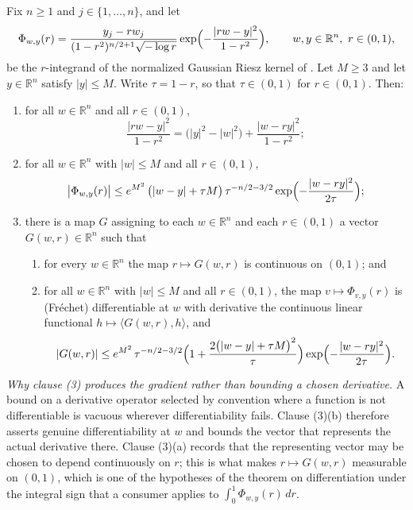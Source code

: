 \begin{lemma}
Fix $n \geq 1$ and $j \in \{1,\ldots,n\}$, and let
\[
  \Phi_{w,y}(r)
    = \frac{y_j - r w_j}{(1-r^2)^{n/2+1}\sqrt{-\log r}}
      \exp\Bigl(-\frac{|rw-y|^2}{1-r^2}\Bigr),
  \qquad w,y \in \mathbb{R}^n,\ r \in (0,1),
\]
be the $r$-integrand of the normalized Gaussian Riesz kernel of
.  Let $M \geq 3$ and let $y \in \mathbb{R}^n$ satisfy
$|y| \leq M$.  Write $\tau = 1-r$, so that $\tau \in (0,1)$ for $r \in (0,1)$.
Then:
\begin{enumerate}
\item for all $w \in \mathbb{R}^n$ and all $r \in (0,1)$,
\[
  \frac{|rw-y|^2}{1-r^2} = \bigl(|y|^2-|w|^2\bigr) + \frac{|w-ry|^2}{1-r^2} ;
\]
\item for all $w \in \mathbb{R}^n$ with $|w| \leq M$ and all $r \in (0,1)$,
\[
  \bigl|\Phi_{w,y}(r)\bigr|
    \leq e^{M^2}\,\bigl(|w-y| + \tau M\bigr)\,\tau^{-n/2-3/2}
      \exp\Bigl(-\frac{|w-ry|^2}{2\tau}\Bigr) ;
\]
\item there is a map $G$ assigning to each $w \in \mathbb{R}^n$ and each
$r \in (0,1)$ a vector $G(w,r) \in \mathbb{R}^n$ such that
  \begin{enumerate}
  \item for every $w \in \mathbb{R}^n$ the map $r \mapsto G(w,r)$ is continuous
    on $(0,1)$; and
  \item for all $w \in \mathbb{R}^n$ with $|w| \leq M$ and all $r \in (0,1)$,
    the map $v \mapsto \Phi_{v,y}(r)$ is (Fr\'echet) differentiable at $w$ with
    derivative the continuous linear functional
    $h \mapsto \langle G(w,r), h\rangle$, and
    \[
      |G(w,r)| \leq e^{M^2}\,\tau^{-n/2-3/2}
        \Bigl(1 + \frac{2\bigl(|w-y| + \tau M\bigr)^2}{\tau}\Bigr)
        \exp\Bigl(-\frac{|w-ry|^2}{2\tau}\Bigr) .
    \]
  \end{enumerate}
\end{enumerate}

\emph{Why clause (3) produces the gradient rather than bounding a chosen
derivative.}  A bound on a derivative operator selected by convention where a
function is not differentiable is vacuous wherever differentiability fails.
Clause (3)(b) therefore asserts genuine differentiability at $w$ and bounds the
vector that represents the actual derivative there.  Clause (3)(a) records that
the representing vector may be chosen to depend continuously on $r$; this is
what makes $r \mapsto G(w,r)$ measurable on $(0,1)$, which is one of the
hypotheses of the theorem on differentiation under the integral sign that a
consumer applies to $\int_0^1\Phi_{w,y}(r)\,dr$.


\end{lemma}

